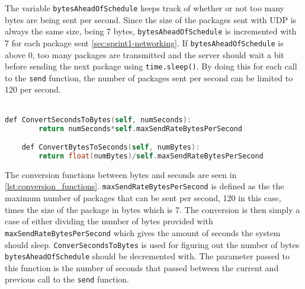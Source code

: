 The variable \texttt{bytesAheadOfSchedule} keeps track of whether or not too many bytes are being sent per second.
Since the size of the packages sent with UDP is always the same size, being 7 bytes, \texttt{bytesAheadOfSchedule} is incremented with 7 for each package sent \autoref{sec:sprint1-networking}.
If \texttt{bytesAheadOfSchedule} is above 0, too many packages are transmitted and the server should wait a bit before sending the next package using \texttt{time.sleep()}.
By doing this for each call to the \texttt{send} function, the number of packages sent per second can be limited to 120 per second.
\\\\
\begin{lstlisting}[caption={function for converting seconds to bytes and bytes to seconds}, captionpos=b,language=C,label={lst:conversion_functions}]
    def ConvertSecondsToBytes(self, numSeconds):
        return numSeconds*self.maxSendRateBytesPerSecond

    def ConvertBytesToSeconds(self, numBytes):
        return float(numBytes)/self.maxSendRateBytesPerSecond
\end{lstlisting}
\noindent
The conversion functions between bytes and seconds are seen in \autoref{lst:conversion_functions}.
\texttt{maxSendRateBytesPerSecond} is defined as the the maximum number of packages that can be sent per second, 120 in this case, times the size of the package in bytes which is 7.
The conversion is then simply a case of either dividing the number of bytes provided with \texttt{maxSendRateBytesPerSecond} which gives the amount of seconds the system should sleep.
\texttt{ConverSecondsToBytes} is used for figuring out the number of bytes \texttt{bytesAheadOfSchedule} should be decremented with.
The parameter passed to this function is the number of seconds that passed between the current and previous call to the \texttt{send} function.
